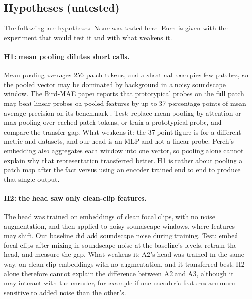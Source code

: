\documentclass[letterpaper]{article} %
\begin{document}
\subsection{Hypotheses (untested)}
The following are hypotheses. None was tested here. Each is given with the experiment that would test it and with what weakens it.

\paragraph{H1: mean pooling dilutes short calls.}
Mean pooling averages 256 patch tokens, and a short call occupies few patches, so the pooled vector may be dominated by background in a noisy soundscape window. The Bird-MAE paper reports that prototypical probes on the full patch map beat linear probes on pooled features by up to 37 percentage points of mean average precision on its benchmark \citep{rauch2025can}. Test: replace mean pooling by attention or max pooling over cached patch tokens, or train a prototypical probe, and compare the transfer gap. What weakens it: the 37-point figure is for a different metric and datasets, and our head is an MLP and not a linear probe. Perch's embedding also aggregates each window into one vector, so pooling alone cannot explain why that representation transferred better. H1 is rather about pooling a patch map after the fact versus using an encoder trained end to end to produce that single output.

\paragraph{H2: the head saw only clean-clip features.}
The head was trained on embeddings of clean focal clips, with no noise augmentation, and then applied to noisy soundscape windows, where features may shift. Our baseline did add soundscape noise during training. Test: embed focal clips after mixing in soundscape noise at the baseline's levels, retrain the head, and measure the gap. What weakens it: A2's head was trained in the same way, on clean-clip embeddings with no augmentation, and it transferred best. H2 alone therefore cannot explain the difference between A2 and A3, although it may interact with the encoder, for example if one encoder's features are more sensitive to added noise than the other's.
\end{document}
